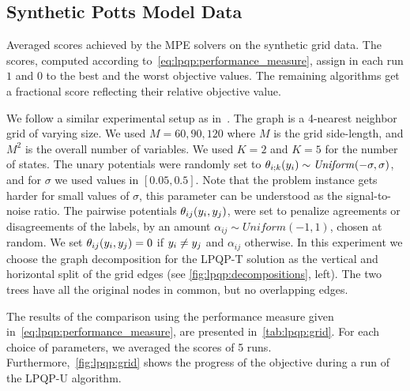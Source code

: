 \subsection{Synthetic Potts Model Data}

\begin{table}[htb]
    \centering
    
    \caption[]{
    Averaged scores achieved by the \ac{MPE} solvers on the synthetic grid data. 
    The scores, computed according to~\eqref{eq:lpqp:performance_measure}, 
    assign in each run $1$ and $0$ to the best and the
    worst objective values. The remaining algorithms get a fractional 
    score reflecting their relative objective value.}
    \label{tab:lpqp:grid}
\end{table}

We follow a similar experimental setup as in~\parencite{Ravikumar2010}. The graph is 
a 4-nearest neighbor grid of varying size. We used $M=60,90,120$ 
where $M$ is the grid side-length, and $M^2$ is the overall number of variables. 
We used $K=2$ and $K=5$ for the number of states. The unary potentials 
were randomly set to $\theta_{i;k}(y_i) \sim \mathit{Uniform}(-\sigma,
\sigma)$, and for $\sigma$ we used values in $[0.05, 0.5]$. 
Note that the problem instance gets harder for small values of $\sigma$, this 
parameter can be understood as the signal-to-noise ratio. The pairwise potentials  
$\theta_{ij}(y_i,y_j)$, were set to penalize agreements or disagreements 
of the labels, by an amount $\alpha_{ij} \sim \mathit{Uniform}(-1,1)$, chosen at 
random. We set $\theta_{ij}(y_i,y_j) = 0$ if
$y_i \neq y_j$ and $\alpha_{ij}$ otherwise. 
In this experiment we choose the graph decomposition for the \acs{LPQP-T}
solution as the vertical and horizontal split of the grid edges (see
\autoref{fig:lpqp:decompositions}, left). The two 
trees have all the original nodes in common, but no 
overlapping edges. 

The results of the comparison using the performance measure given 
in~\eqref{eq:lpqp:performance_measure}, are presented in~\autoref{tab:lpqp:grid}. 
For each choice of parameters, we averaged 
the scores of 5 runs. Furthermore,~\autoref{fig:lpqp:grid} shows the progress of
the objective during a run of the \acs{LPQP-U} algorithm.

